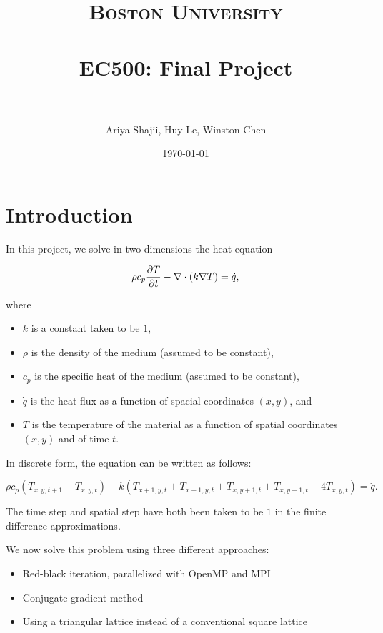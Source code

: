 \documentclass[paper=a4, fontsize=11pt]{scrartcl} %
\title{	
\normalfont \normalsize 
\textsc{Boston University} \\ [25pt] %
\horrule{0.5pt} \\[0.4cm] %
\huge EC500: Final Project \\
\horrule{2pt} \\[0.5cm] %
}
\author{Ariya Shajii, Huy Le, Winston Chen}
\date{\normalsize\today}
\numberwithin{equation}{section} %
\numberwithin{figure}{section} %
\numberwithin{table}{section} %
\begin{document}
\maketitle


\section{Introduction}

In this project, we solve in two dimensions the heat equation

\begin{equation}
	\rho c_p {\partial T \over \partial t} - \nabla \cdot (k \nabla T) = \dot{q},
	\label{eq:main}
\end{equation}

where

\begin{itemize}
	\item $k$ is a constant taken to be $1$,
	\item $\rho$ is the density of the medium (assumed to be constant),
	\item $c_p$ is the specific heat of the medium (assumed to be constant),
	\item $\dot{q}$ is the heat flux as a function of spacial coordinates $(x,y)$, and
	\item $T$ is the temperature of the material as a function of spatial coordinates $(x,y)$ and of time $t$.
\end{itemize}

In discrete form, the equation can be written as follows:

\begin{equation}
	\rho c_p (T_{x,y,t+1} - T_{x,y,t}) -
	k (T_{x+1,y,t} + T_{x-1,y,t} + T_{x,y+1,t} + T_{x,y-1,t} - 4T_{x,y,t}) = \dot{q}.
\end{equation}

The time step and spatial step have both been taken to be $1$ in the finite difference approximations. \linebreak

We now solve this problem using three different approaches:

\begin{itemize}
	\item Red-black iteration, parallelized with OpenMP and MPI
	\item Conjugate gradient method
	\item Using a triangular lattice instead of a conventional square lattice
\end{itemize}
\end{document}
